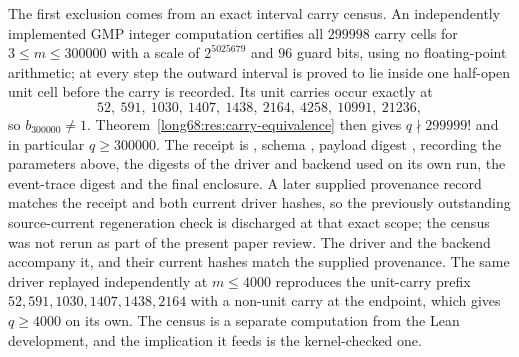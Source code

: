 The first exclusion comes from an exact interval carry census.  An
independently implemented GMP integer computation certifies all $299998$
carry cells for $3\le m\le300000$ with a scale of $2^{5025679}$ and $96$
guard bits, using no floating-point arithmetic; at every step the outward
interval is proved to lie inside one half-open unit cell before the carry is
recorded.  Its unit carries occur exactly at
\[
 52,\ 591,\ 1030,\ 1407,\ 1438,\ 2164,\ 4258,\ 10991,\ 21236,
\]
so $b_{300000}\ne1$.  Theorem~\ref{long68:res:carry-equivalence} then gives
$q\nmid299999!$ and in particular $q\ge300000$.  The receipt is
, schema
, payload digest
,
recording the parameters above, the digests of the driver and backend used on
its own run, the event-trace digest and the final enclosure.  A later supplied
provenance record matches the receipt and both current driver hashes, so the
previously outstanding source-current regeneration check is discharged at
that exact scope; the census was not rerun as part of the present paper review.
The driver
 and the backend
 accompany it, and their
current hashes match the supplied provenance.  The same driver replayed independently at
$m\le4000$ reproduces the unit-carry prefix $52,591,1030,1407,1438,2164$ with
a non-unit carry at the endpoint, which gives $q\ge4000$ on its own.  The
census is a separate computation from the Lean development, and the
implication it feeds is the kernel-checked one.

